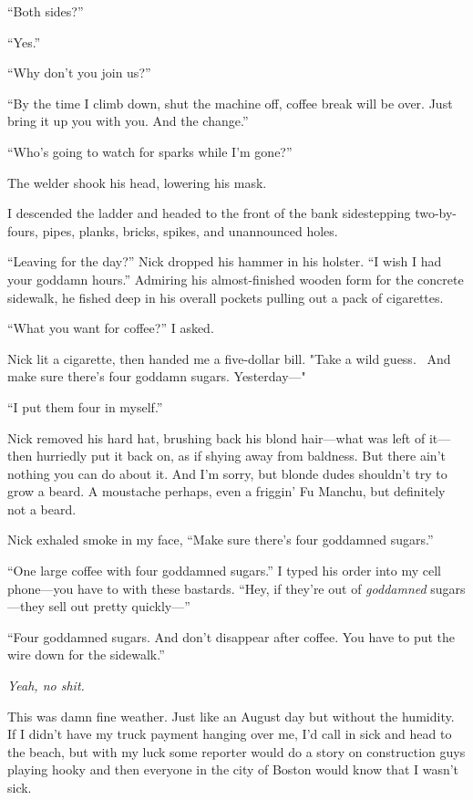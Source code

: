 ``Both sides?''

``Yes.''

``Why don't you join us?''

``By the time I climb down, shut the machine off, coffee break will be
over. Just bring it up you with you. And the change.''

``Who's going to watch for sparks while I'm gone?''

The welder shook his head, lowering his mask. ~

I descended the ladder and headed to the front of the bank sidestepping
two-by-fours, pipes, planks, bricks, spikes, and unannounced holes.

``Leaving for the day?'' Nick dropped his hammer in his holster. ``I
wish I had your goddamn hours.'' Admiring his almost-finished wooden
form for the concrete sidewalk, he fished deep in his overall pockets
pulling out a pack of cigarettes.

``What you want for coffee?'' I asked. ~

Nick lit a cigarette, then handed me a five-dollar bill. "Take a wild
guess. ~And make sure there's four goddamn sugars. Yesterday---"

``I put them four in myself.''

Nick removed his hard hat, brushing back his blond hair---what was left
of it---then hurriedly put it back on, as if shying away from baldness.
But there ain't nothing you can do about it. And I'm sorry, but blonde
dudes shouldn't try to grow a beard. A moustache perhaps, even a
friggin' Fu Manchu, but definitely not a beard. ~

Nick exhaled smoke in my face, ``Make sure there's four goddamned
sugars.''

``One large coffee with four goddamned sugars.'' I typed his order into
my cell phone---you have to with these bastards. ``Hey, if they're out
of \emph{goddamned} sugars---they sell out pretty quickly---''

``Four goddamned sugars. And don't disappear after coffee. You have to
put the wire down for the sidewalk.''

\emph{Yeah, no shit.}

This was damn fine weather. Just like an August day but without the
humidity. If I didn't have my truck payment hanging over me, I'd call in
sick and head to the beach, but with my luck some reporter would do a
story on construction guys playing hooky and then everyone in the city
of Boston would know that I wasn't sick.

